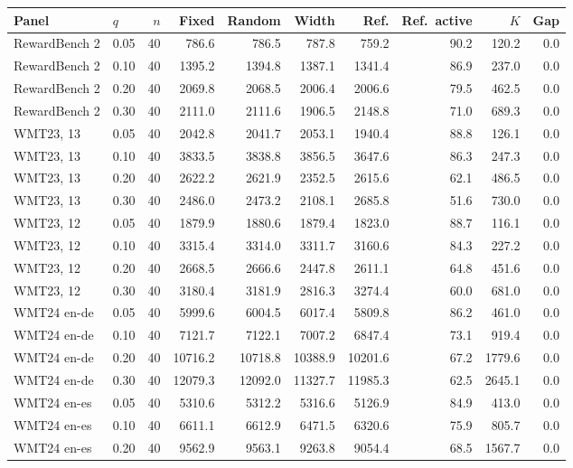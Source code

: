 \begin{table}[t]
\centering\small


\begin{tabular}{llrrrrrrrr}
\toprule
Panel & $q$ & $n$ & Fixed & Random & Width & Ref. & Ref.\ active & $K$ & Gap \\
\midrule
RewardBench 2 & 0.05 & 40 & 786.6 & 786.5 & 787.8 & 759.2 & 90.2 & 120.2 & 0.0 \\
RewardBench 2 & 0.10 & 40 & 1395.2 & 1394.8 & 1387.1 & 1341.4 & 86.9 & 237.0 & 0.0 \\
RewardBench 2 & 0.20 & 40 & 2069.8 & 2068.5 & 2006.4 & 2006.6 & 79.5 & 462.5 & 0.0 \\
RewardBench 2 & 0.30 & 40 & 2111.0 & 2111.6 & 1906.5 & 2148.8 & 71.0 & 689.3 & 0.0 \\
WMT23, 13 & 0.05 & 40 & 2042.8 & 2041.7 & 2053.1 & 1940.4 & 88.8 & 126.1 & 0.0 \\
WMT23, 13 & 0.10 & 40 & 3833.5 & 3838.8 & 3856.5 & 3647.6 & 86.3 & 247.3 & 0.0 \\
WMT23, 13 & 0.20 & 40 & 2622.2 & 2621.9 & 2352.5 & 2615.6 & 62.1 & 486.5 & 0.0 \\
WMT23, 13 & 0.30 & 40 & 2486.0 & 2473.2 & 2108.1 & 2685.8 & 51.6 & 730.0 & 0.0 \\
WMT23, 12 & 0.05 & 40 & 1879.9 & 1880.6 & 1879.4 & 1823.0 & 88.7 & 116.1 & 0.0 \\
WMT23, 12 & 0.10 & 40 & 3315.4 & 3314.0 & 3311.7 & 3160.6 & 84.3 & 227.2 & 0.0 \\
WMT23, 12 & 0.20 & 40 & 2668.5 & 2666.6 & 2447.8 & 2611.1 & 64.8 & 451.6 & 0.0 \\
WMT23, 12 & 0.30 & 40 & 3180.4 & 3181.9 & 2816.3 & 3274.4 & 60.0 & 681.0 & 0.0 \\
WMT24 en-de & 0.05 & 40 & 5999.6 & 6004.5 & 6017.4 & 5809.8 & 86.2 & 461.0 & 0.0 \\
WMT24 en-de & 0.10 & 40 & 7121.7 & 7122.1 & 7007.2 & 6847.4 & 73.1 & 919.4 & 0.0 \\
WMT24 en-de & 0.20 & 40 & 10716.2 & 10718.8 & 10388.9 & 10201.6 & 67.2 & 1779.6 & 0.0 \\
WMT24 en-de & 0.30 & 40 & 12079.3 & 12092.0 & 11327.7 & 11985.3 & 62.5 & 2645.1 & 0.0 \\
WMT24 en-es & 0.05 & 40 & 5310.6 & 5312.2 & 5316.6 & 5126.9 & 84.9 & 413.0 & 0.0 \\
WMT24 en-es & 0.10 & 40 & 6611.1 & 6612.9 & 6471.5 & 6320.6 & 75.9 & 805.7 & 0.0 \\
WMT24 en-es & 0.20 & 40 & 9562.9 & 9563.1 & 9263.8 & 9054.4 & 68.5 & 1567.7 & 0.0 \\

\end{tabular}
\end{table}
